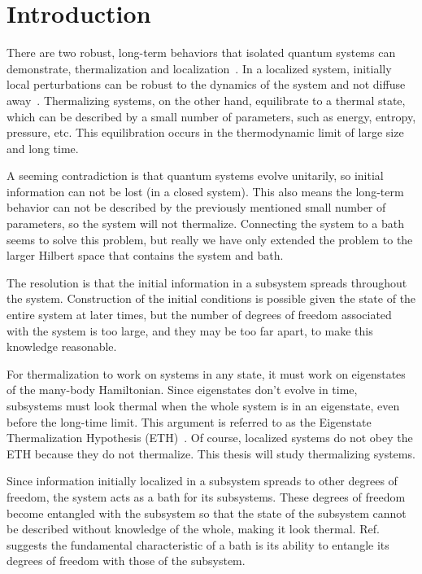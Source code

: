 \section{Introduction} \label{sec:intro}


There are two robust, long-term behaviors that isolated quantum systems can demonstrate, thermalization and localization~\cite{Nandkishore2015}. In a localized system, initially local perturbations can be robust to the dynamics of the system and not diffuse away~\cite{Anderson58}. Thermalizing systems, on the other hand, equilibrate to a thermal state, which can be described by a small number of parameters, such as energy, entropy, pressure, etc. This equilibration occurs in the thermodynamic limit of large size and long time. 

A seeming contradiction is that quantum systems evolve unitarily, so initial information can not be lost (in a closed system). This also means the long-term behavior can not be described by the previously mentioned small number of parameters, so the system will not thermalize. Connecting the system to a bath seems to solve this problem, but really we have only extended the problem to the larger Hilbert space that contains the system and bath. 

The resolution is that the initial information in a subsystem spreads throughout the system. Construction of the initial conditions is possible given the state of the entire system at later times, but the number of degrees of freedom associated with the system is too large, and they may be too far apart, to make this knowledge reasonable. 

For thermalization to work on systems in any state, it must work on eigenstates of the many-body Hamiltonian. Since eigenstates don't evolve in time, subsystems must look thermal when the whole system is in an eigenstate, even before the long-time limit. This argument is referred to as the Eigenstate Thermalization Hypothesis (ETH)~\cite{Deutsch91, Srednicki1994, Rigol2008, Nandkishore2015}. Of course, localized systems do not obey the ETH because they do not thermalize. This thesis will study thermalizing systems.

Since information initially localized in a subsystem spreads to other degrees of freedom, the system acts as a bath for its subsystems. These degrees of freedom become entangled with the subsystem so that the state of the subsystem cannot be described without knowledge of the whole, making it look thermal. Ref.~\cite{Nandkishore2015} suggests the fundamental characteristic of a bath is its ability to entangle its degrees of freedom with those of the subsystem.

